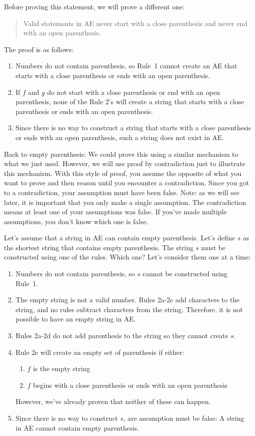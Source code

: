 \documentclass[letterpaper,12pt,openany,reqno]{book}%
\begin{document}
Before proving this statement, we will prove a different one:
\begin{quote}
Valid statements in AE never start with a close parenthesis and never end with an open parenthesis.
\end{quote}
The proof is as follows:
\begin{enumerate}
\item Numbers do not contain parenthesis, so Rule~1 cannot create an AE that starts with a close parenthesis or ends with an open parenthesis.
\item If $f$ and $g$ do not start with a close parenthesis or end with an open parenthesis, none of the Rule 2's will create a string that starts with a close parenthesis or ends with an open parenthesis.
\item Since there is no way to construct a string that starts with a close parenthesis or ends with an open parenthesis, such a string does not exist in AE.
\end{enumerate}

Back to empty parenthesis: We could prove this using a similar mechanism to what we just used. However, we will use proof by contradiction just to illustrate this mechanism. With this style of proof, you assume the opposite of what you want to prove and then reason until you encounter a contradiction. Since you got to a contradiction, your assumption must have been false. Note: as we will see later, it is important that you only make a single assumption. The contradiction means at least one of your assumptions was false. If you've made multiple assumptions, you don't know which one is false.

Let's assume that a string in AE can contain empty parenthesis. Let's define $s$ as the shortest string that contains empty parenthesis. The string $s$ must be constructed using one of the rules. Which one? Let's consider them one at a time:
\begin{enumerate}
\item Numbers do not contain parenthesis, so $s$ cannot be constructed using Rule~1.
\item The empty string is not a valid number. Rules 2a-2e add characters to the string, and no rules subtract characters from the string. Therefore, it is not possible to have an empty string in AE.
\item Rules 2a-2d do not add parenthesis to the string so they cannot create $s$.
\item Rule 2e will create an empty set of parenthesis if either:
\begin{enumerate}
\item $f$ is the empty string 
\item $f$ begins with a close parenthesis or ends with an open parenthesis
\end{enumerate}
However, we've already proven that neither of these can happen.
\item Since there is no way to construct $s$, are assumption must be false: A string in AE cannot contain empty parenthesis.
\end{enumerate}
\end{document}
